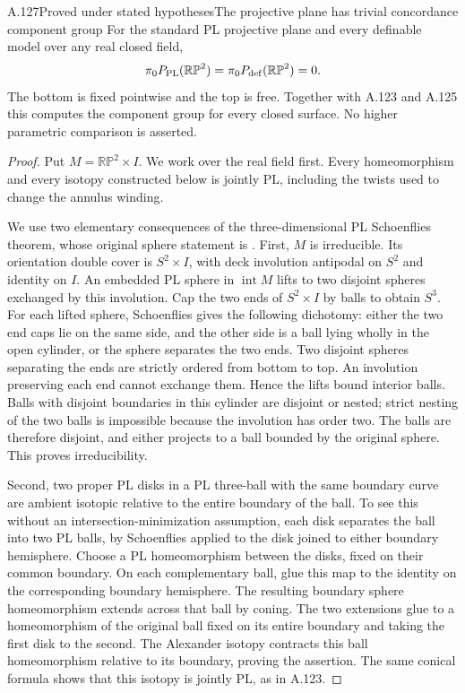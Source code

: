 \begin{saresult}{A.127}{Proved under stated hypotheses}{The projective plane has trivial concordance component group}
For the standard PL projective plane and every definable model over
any real closed field,
\[
 \pi_0P_{\rm PL}(\mathbb {RP}^2)
 =\pi_0P_{\rm def}(\mathbb {RP}^2)=0.
\]
The bottom is fixed pointwise and the top is free. Together with
A.123 and A.125 this computes the component group for every closed
surface. No higher parametric comparison is asserted.
\end{saresult}
\begin{proof}
Put $M=\mathbb {RP}^2\times I$. We work over the real field first.
Every homeomorphism and every isotopy constructed below is jointly
PL, including the twists used to change the annulus winding.

We use two elementary consequences of the three-dimensional
PL Schoenflies theorem, whose original sphere statement is
\cite[p.~6, with proof pp.~7--8]{Alexander1924}.
First, $M$ is irreducible. Its orientation double cover is
$S^2\times I$, with deck involution antipodal on $S^2$ and identity
on $I$. An embedded PL sphere in $\operatorname{int}M$ lifts to two
disjoint spheres exchanged by this involution. Cap the two ends of
$S^2\times I$ by balls to obtain $S^3$. For each lifted sphere,
Schoenflies gives the following dichotomy: either the two end caps
lie on the same side, and the other side is a ball lying wholly in
the open cylinder, or the sphere separates the two ends.
Two disjoint spheres separating the ends are strictly ordered from
bottom to top. An involution preserving each end cannot exchange
them. Hence the lifts bound interior balls. Balls with disjoint
boundaries in this cylinder are disjoint or nested; strict nesting
of the two balls is impossible because the involution has order two.
The balls are therefore disjoint, and either projects to a ball
bounded by the original sphere. This proves irreducibility.

Second, two proper PL disks in a PL three-ball with the same
boundary curve are ambient isotopic relative to the entire boundary
of the ball. To see this without an intersection-minimization
assumption, each disk separates the ball into two PL balls, by
Schoenflies applied to the disk joined to either boundary hemisphere.
Choose a PL homeomorphism between the disks, fixed on their common
boundary. On each complementary ball, glue this map to the identity
on the corresponding boundary hemisphere. The resulting boundary
sphere homeomorphism extends across that ball by coning. The two
extensions glue to a homeomorphism of the original ball fixed on
its entire boundary and taking the first disk to the second. The
Alexander isotopy contracts this ball homeomorphism relative to its
boundary, proving the assertion. The same conical formula shows
that this isotopy is jointly PL, as in A.123.


\end{proof}
